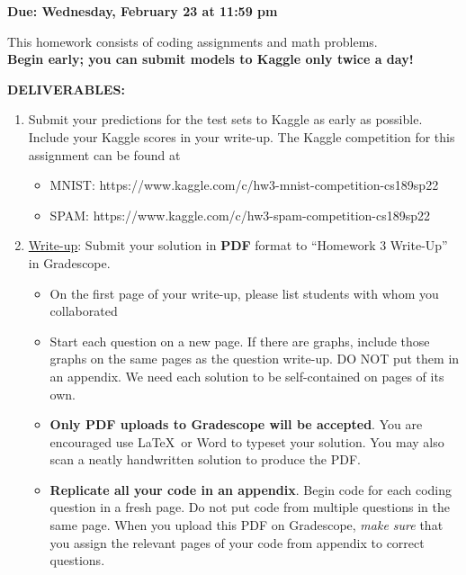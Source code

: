 \documentclass[11pt]{article}
\begin{document}
\maketitle
\fontsize{12}{15}\selectfont



\textbf{Due: Wednesday, February 23 at 11:59 pm}
\newline

This homework consists of coding assignments and math problems. \\
\textbf{Begin early; you can submit models to Kaggle only twice a day!}

\textbf{DELIVERABLES:}

\begin{enumerate}[topsep=1pt]
  \item
    Submit your predictions for the test sets to Kaggle as early as possible. Include your Kaggle scores in your write-up.
    The Kaggle competition for this assignment can be found at
    \begin{itemize}
     \item MNIST: https://www.kaggle.com/c/hw3-mnist-competition-cs189sp22
     \item SPAM: https://www.kaggle.com/c/hw3-spam-competition-cs189sp22
     \end{itemize}

\item \underline{Write-up}: Submit your solution in {\bf PDF} format to
		``Homework 3 Write-Up'' in Gradescope.
	\begin{itemize}[topsep=0pt, noitemsep]    
		\item On the first page of your write-up, please list students with whom you collaborated

		\item Start each question on a new
        page. If there are graphs, include those graphs on the same pages as the question write-up. DO NOT put them in an appendix. We need each solution to be self-contained on pages of its own.

		\item \textbf{Only PDF uploads to Gradescope will be accepted}. You are encouraged
			use \LaTeX\ or Word to typeset your solution. You may also scan a neatly handwritten
			solution to produce the PDF. 

		\item \textbf{Replicate all your code in an appendix}. 
			Begin code for each coding question in a fresh page.
			Do not put code from multiple questions in the same page.
			When you upload this PDF on Gradescope, \emph{make sure}
			that you assign the relevant pages of your code from appendix to correct questions.


\end{itemize}
\end{enumerate}
\end{document}
